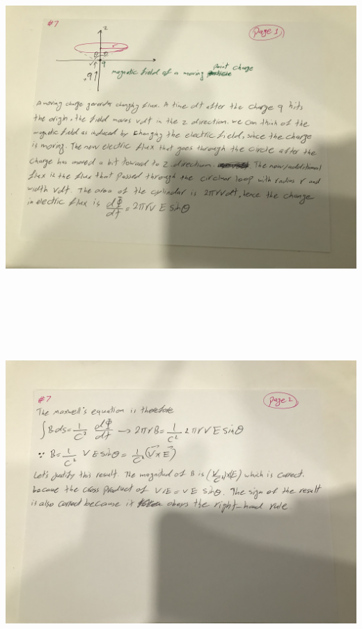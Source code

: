 \documentclass[fleqn]{article}
\begin{document}
\begin{enumerate}
    \includegraphics[height=13cm, width=15cm]{7A.jpg}

    \pagebreak

    \includegraphics[height=13cm, width=15cm]{7B.jpg}


\end{enumerate}
\end{document}
